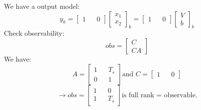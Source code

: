 \documentclass[12pt,a4paper]{article}
\begin{document}
	We have a output model:
	\begin{equation}
		\boxed{
			y_k = 
			\begin{bmatrix}
				1 &   & 0 
			\end{bmatrix}
			\begin{bmatrix}
				x_1 \\
				x_2 
			\end{bmatrix}_k = 
			\begin{bmatrix}
				1 &   & 0 
			\end{bmatrix}
			\begin{bmatrix}
				V \\
				b 
			\end{bmatrix}_k
		}
		\label{eq11}
	\end{equation}
	Check observability:
	\[obs = 
	\begin{bmatrix}
		C  \\
		CA 
	\end{bmatrix}\]
	We have:
	\[A = 
	\begin{bmatrix}
		1 &   & T_s \\
		0 &   & 1   
	\end{bmatrix} \text{and } C = 
	\begin{bmatrix}
		1 &   & 0 
	\end{bmatrix}\]
	\[\rightarrow obs = 
	\begin{bmatrix}
		1 &   & 0   \\
		1 &   & T_s 
	\end{bmatrix} \text{is full rank = observable.}\]
	
\end{document}
